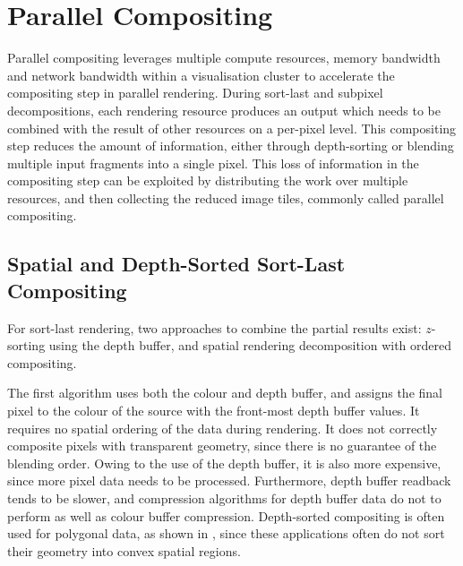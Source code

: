 \section{Parallel Compositing\label{sparcomp}}

Parallel compositing leverages multiple compute resources, memory bandwidth and
network bandwidth within a visualisation cluster to accelerate the compositing
step in parallel rendering. During sort-last and subpixel decompositions, each
rendering resource produces an output which needs to be combined with the
result of other resources on a per-pixel level. This compositing step reduces
the amount of information, either through depth-sorting or blending multiple
input fragments into a single pixel. This loss of information in the
compositing step can be exploited by distributing the work over multiple
resources, and then collecting the reduced image tiles, commonly called parallel
compositing.

\subsection{Spatial and Depth-Sorted Sort-Last Compositing}

For sort-last rendering, two approaches to combine the partial
results exist: $z$-sorting using the depth buffer, and spatial rendering
decomposition with ordered compositing.

The first algorithm uses both the colour and depth buffer, and assigns the
final pixel to the colour of the source with the front-most depth buffer
values. It requires no spatial ordering of the data during rendering. It does
not correctly composite pixels with transparent geometry, since there is no
guarantee of the blending order. Owing to the use of the depth buffer, it is
also more expensive, since more pixel data needs to be processed. Furthermore,
depth buffer readback tends to be slower, and compression algorithms for depth
buffer data do not to perform as well as colour buffer compression.
Depth-sorted compositing is often used for polygonal data, as shown in
, since these applications often do not sort their geometry into
convex spatial regions.

